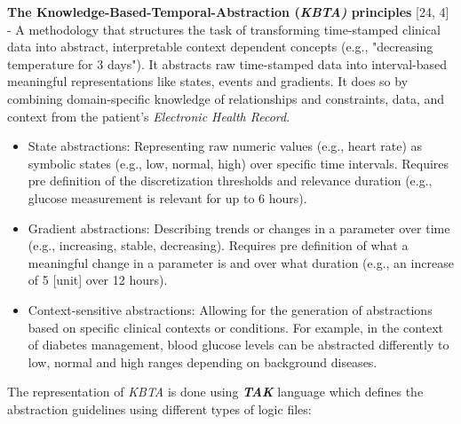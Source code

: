\documentclass[
]{article}
\begin{document}
\textbf{The Knowledge-Based-Temporal-Abstraction (\emph{KBTA)}
principles} {[}24, 4{]} - A methodology that structures the task of
transforming time-stamped clinical data into abstract, interpretable
context dependent concepts (e.g., "decreasing temperature for 3 days").
It abstracts raw time-stamped data into interval-based meaningful
representations like states, events and gradients. It does so by
combining domain-specific knowledge of relationships and constraints,
data, and context from the patient's \emph{Electronic Health Record}.

\begin{itemize}
\item
  State abstractions: Representing raw numeric values (e.g., heart rate)
  as symbolic states (e.g., low, normal, high) over specific time
  intervals. Requires pre definition of the discretization thresholds
  and relevance duration (e.g., glucose measurement is relevant for up
  to 6 hours).
\item
  Gradient abstractions: Describing trends or changes in a parameter
  over time (e.g., increasing, stable, decreasing). Requires pre
  definition of what a meaningful change in a parameter is and over what
  duration (e.g., an increase of 5 {[}unit{]} over 12 hours).
\item
  Context-sensitive abstractions: Allowing for the generation of
  abstractions based on specific clinical contexts or conditions. For
  example, in the context of diabetes management, blood glucose levels
  can be abstracted differently to low, normal and high ranges depending
  on background diseases.
\end{itemize}

The representation of \emph{KBTA} is done using \emph{\textbf{TAK}}
language which defines the abstraction guidelines using different types
of logic files:
\end{document}
